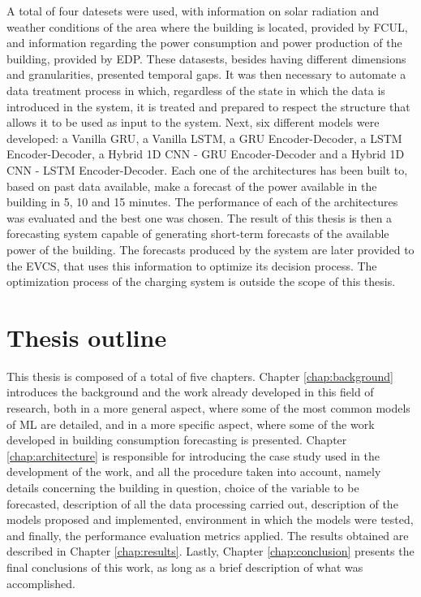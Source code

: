 A total of four datesets were used, with information on solar radiation and weather conditions of the area where the building is located, provided by \ac{FCUL}, and information regarding the power consumption and power production of the building, provided by \ac{EDP}. These datasests, besides having different dimensions and granularities, presented temporal gaps. It was then necessary to automate a data treatment process in which, regardless of the state in which the data is introduced in the system, it is treated and prepared to respect the structure that allows it to be used as input to the system. Next, six different models were developed: a Vanilla \ac{GRU}, a Vanilla \ac{LSTM}, a \ac{GRU} Encoder-Decoder, a \ac{LSTM} Encoder-Decoder, a Hybrid \ac{1D CNN} - \ac{GRU} Encoder-Decoder and a Hybrid \ac{1D CNN} - \ac{LSTM} Encoder-Decoder. Each one of the architectures has been built to, based on past data available, make a forecast of the power available in the building in 5, 10 and 15 minutes. The performance of each of the architectures was evaluated and the best one was chosen. The result of this thesis is then a forecasting system capable of generating short-term forecasts of the available power of the building. The forecasts produced by the system are later provided to the \ac{EVCS}, that uses this information to optimize its decision process. The optimization process of the charging system is outside the scope of this thesis.

\section{Thesis outline}

This thesis is composed of a total of five chapters. Chapter \ref{chap:background} introduces the background and the work already developed in this field of research, both in a more general aspect, where some of the most common models of \ac{ML} are detailed, and in a more specific aspect, where some of the work developed in building consumption forecasting is presented. Chapter \ref{chap:architecture} is responsible for introducing the case study used in the development of the work, and all the procedure taken into account, namely details concerning the building in question, choice of the variable to be forecasted, description of all the data processing carried out, description of the models proposed and implemented, environment in which the models were tested, and finally, the performance evaluation metrics applied. The results obtained are described in Chapter \ref{chap:results}. Lastly, Chapter \ref{chap:conclusion} presents the final conclusions of this work, as long as a brief description of what was accomplished.